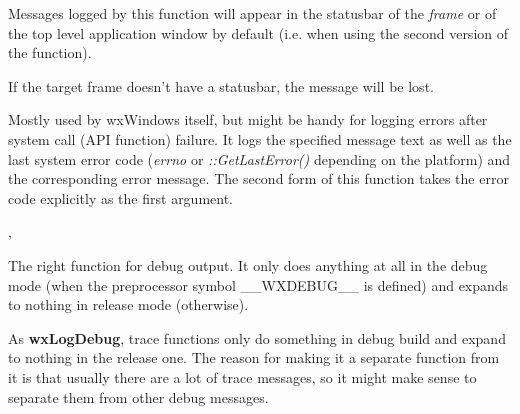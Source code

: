 \label{wxlogstatus}



Messages logged by this function will appear in the statusbar of the {\it
frame} or of the top level application window by default (i.e. when using
the second version of the function).

If the target frame doesn't have a statusbar, the message will be lost.

\label{wxlogsyserror}


Mostly used by wxWindows itself, but might be handy for logging errors after
system call (API function) failure. It logs the specified message text as well
as the last system error code ({\it errno} or {\it ::GetLastError()} depending
on the platform) and the corresponding error message. The second form
of this function takes the error code explicitly as the first argument.


,

\label{wxlogdebug}


The right function for debug output. It only does anything at all in the debug
mode (when the preprocessor symbol \_\_WXDEBUG\_\_ is defined) and expands to
nothing in release mode (otherwise).

\label{wxlogtrace}




As {\bf wxLogDebug}, trace functions only do something in debug build and
expand to nothing in the release one. The reason for making
it a separate function from it is that usually there are a lot of trace
messages, so it might make sense to separate them from other debug messages.

